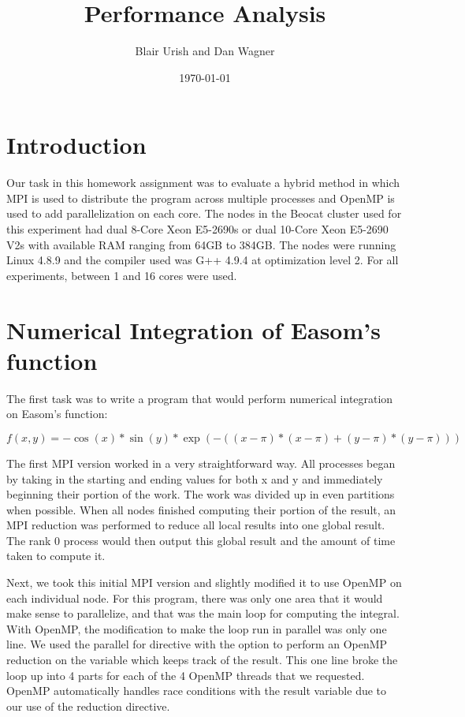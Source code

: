 \documentclass[notitlepage, letterpaper, 12pt]{report}
\title{Performance Analysis}
\author{Blair Urish and Dan Wagner}
\date{\today}
\begin{document}
\maketitle

\section*{Introduction}
Our task in this homework assignment was to evaluate a hybrid method in which MPI is used to distribute the program across multiple processes and OpenMP
is used to add parallelization on each core.  
The nodes in the Beocat cluster used for this experiment had dual 8-Core Xeon E5-2690s or dual 10-Core Xeon E5-2690 V2s with available RAM ranging from 64GB to 384GB. The nodes were running Linux 4.8.9 and the compiler used was G++ 4.9.4 at 
optimization level 2. For all experiments, between 1 and 16 cores were used.  

\section*{Numerical Integration of Easom's function}

The first task was to write a program that would perform numerical integration on Easom's function:

\[f(x,y) = -\cos(x)*\sin(y)*\exp(-((x - \pi)*(x - \pi) + (y - \pi)*(y - \pi))) \]

The first MPI version worked in a very straightforward way. All processes began by taking in the starting and ending
values for both x and y and immediately beginning their portion of the work. The work was divided up in even partitions when possible.
When all nodes finished computing their portion of the result, an MPI reduction was performed to reduce all local results into one global result.
The rank 0 process would then output this global result and the amount of time taken to compute it. 

Next, we took this initial MPI version and slightly modified it to use OpenMP on each individual node. For this program, there was only
one area that it would make sense to parallelize, and that was the main loop for computing the integral. With OpenMP, the modification to make the
loop run in parallel was only one line. We used the parallel for directive with the option to perform an OpenMP reduction on the variable which keeps
track of the result. This one line broke the loop up into 4 parts for each of the 4 OpenMP threads that we requested. OpenMP automatically handles
race conditions with the result variable due to our use of the reduction directive. 
\end{document}
